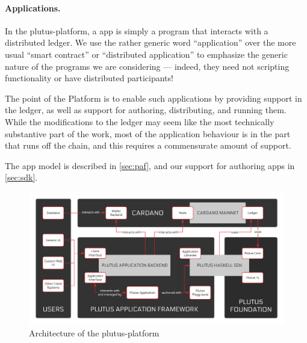 \paragraph{Applications.}
In the \gls{plutus-platform}, a \gls{app} is simply a program that interacts with a distributed ledger.
We use the rather generic word ``application'' over the more usual ``smart contract'' or ``distributed application'' to emphasize the generic nature of the programs we are considering --- indeed, they need not scripting functionality or have distributed participants!

The point of the Platform is to enable such applications by providing support in the ledger, as well as support for authoring, distributing, and running them.
While the modifications to the ledger may seem like the most technically substantive part of the work, most of the application behaviour is in the part that runs off the chain, and this requires a commensurate amount of support.

The \gls{app} model is described in \cref{sec:paf}, and our support for authoring \glspl{app} in \cref{sec:sdk}.

\begin{figure}[t]
  \centering
  \includegraphics[width=\textwidth]{platform-architecture.png}
  \caption{Architecture of the \gls{plutus-platform}}
  \label{fig:platform-architecture}
\end{figure}
